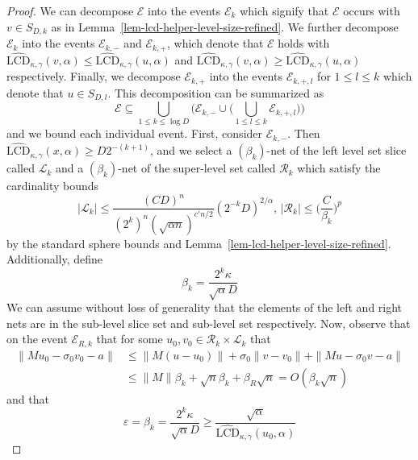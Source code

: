 \documentclass[11pt]{article}
\numberwithin{equation}{section}
\theoremstyle{remark}
\newcommand{\rLCD}{\widehat{\mathrm{LCD}}}
\newcommand{\event}{\mathcal{E}}
\begin{document}
\begin{proof}
    We can decompose $\event$ into the events $\event_{k}$ which signify that $\event$ occurs with $v \in S_{D, k}$ as in Lemma~\ref{lem-lcd-helper-level-size-refined}. We further decompose $\event_{k}$ into the events $\event_{k, -}$ and $\event_{k, +}$, which denote that $\event$ holds with $\rLCD_{\kappa, \gamma}(v, \alpha) \leq \rLCD_{\kappa, \gamma}(u, \alpha)$ and $\rLCD_{\kappa, \gamma}(v, \alpha) \geq \rLCD_{\kappa, \gamma}(u, \alpha)$ respectively. Finally, we decompose $\event_{k, +}$ into the events $\event_{k, +, l}$ for $1 \leq l \leq k$ which denote that $u \in S_{D, l}$. This decomposition can be summarized as 
    \begin{equation*}
        \event \subseteq \bigcup_{1 \leq k \leq \log D} \bigg(\event_{k, -} \cup \bigg(\bigcup_{1 \leq l \leq k}\event_{k, +, l} \bigg) \bigg)
    \end{equation*}
    and we bound each individual event. First, consider $\event_{k, -}$. Then $\rLCD_{\kappa, \gamma}(x, \alpha) \geq D2^{-(k + 1)}$, and we select a $(\beta_{k})$-net of the left level set slice called $\mathcal{L}_k$ and a $(\beta_{k})$-net of the super-level set called $\mathcal{R}_k$ which satisfy the cardinality bounds
    \begin{equation*}
        |\mathcal{L}_k| \leq \frac{(CD)^n}{(2^k)^n(\sqrt{\alpha n})^{c'n/2}}(2^{-k}D)^{2/\alpha} ,\,
        |\mathcal{R}_k| \leq \bigg(\frac{C}{\beta_{k}}\bigg)^p
    \end{equation*}
    by the standard sphere bounds and Lemma~\ref{lem-lcd-helper-level-size-refined}. Additionally, define
    \begin{equation*}
        \beta_{k} = \frac{2^k\kappa}{\sqrt{\alpha}D}
    \end{equation*}
    We can assume without loss of generality that the elements of the left and right nets are in the sub-level slice set and sub-level set respectively. Now, observe that on the event $\event_{R, k}$ that for some $u_0, v_0 \in \mathcal{R}_{k} \times \mathcal{L}_{k}$ that
    \begin{align}\label{eq-right-approximate-fixed}
        \|Mu_0 - \sigma_0 v_0 - a\| &\leq \|M(u - u_0)\| + \sigma_0\|v - v_0\| + \|Mu - \sigma_0 v - a\| \\
        &\leq \|M\| \beta_{k} + \sqrt{n}\beta_{k} + \beta_{R}\sqrt{n} = O(\beta_{k}\sqrt{n})
    \end{align}
    and that
    \begin{equation*}
       \varepsilon = \beta_{k} = \frac{2^k\kappa}{\sqrt{\alpha}D} \geq \frac{\sqrt{\alpha}}{\rLCD_{\kappa, \gamma}(u_0, \alpha)}

\end{equation*}
\end{proof}
\end{document}
